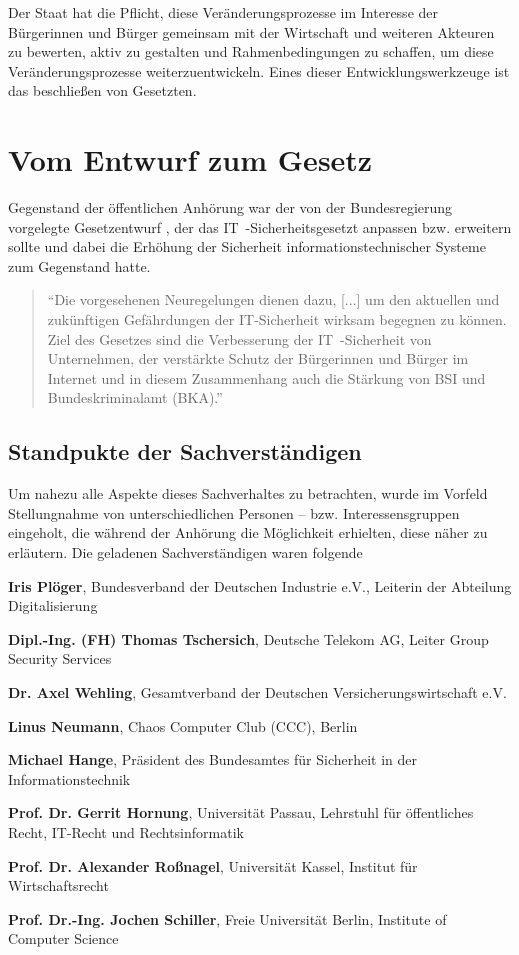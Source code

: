 \documentclass[a4paper,letterpaper,twocolumn,9,5pt,ngerman]{article}
\newcommand{\descitem}[1]{\textbf{#1}}	%
\begin{document}
Der Staat hat die Pflicht, diese Veränderungsprozesse im Interesse der Bürgerinnen und Bürger gemeinsam mit der Wirtschaft und weiteren Akteuren zu bewerten, aktiv zu gestalten und Rahmenbedingungen zu schaffen, um diese Veränderungsprozesse weiterzuentwickeln. \cite{BMI} Eines dieser Entwicklungswerkzeuge ist das beschließen von Gesetzten.

\section{Vom Entwurf zum Gesetz}
\label{sec:EntwurfzumGesetz}
Gegenstand der öffentlichen Anhörung  war der von der Bundesregierung vorgelegte Gesetzentwurf \cite{GesEntw15}, der das IT~-Sicherheitsgesetzt anpassen bzw. erweitern sollte und dabei die Erhöhung der Sicherheit informationstechnischer Systeme zum Gegenstand hatte. 
\begin{quotation}
"`Die vorgesehenen Neuregelungen dienen dazu, [...] um den aktuellen und zukünftigen Gefährdungen der IT-Sicherheit wirksam begegnen zu können. Ziel des Gesetzes sind die Verbesserung der IT~-Sicherheit von Unternehmen, der verstärkte Schutz der Bürgerinnen und Bürger im Internet und in diesem Zusammenhang auch die Stärkung von BSI und Bundeskriminalamt (BKA)."' 
\cite[S. 1]{GesEntw15} 
\end{quotation}

\subsection{Standpukte der Sachverständigen}
\label{subsec:StandpunkteSachverständige}
Um nahezu alle Aspekte dieses Sachverhaltes zu betrachten, wurde im Vorfeld Stellungnahme von unterschiedlichen Personen -- bzw. Interessensgruppen eingeholt, die während der Anhörung die Möglichkeit erhielten, diese näher zu erläutern. Die geladenen Sachverständigen waren folgende

\begin{description*}
    \item	{\descitem{Iris Plöger}}, Bundesverband der Deutschen Industrie e.V., Leiterin der Abteilung Digitalisierung
    \item	{\descitem{Dipl.-Ing.  (FH) Thomas Tschersich}}, Deutsche Telekom AG, Leiter Group Security Services
    \item	{\descitem{Dr. Axel Wehling}}, Gesamtverband der Deutschen Versicherungswirtschaft e.V.
    \item	{\descitem{Linus Neumann}}, Chaos Computer Club (CCC), Berlin

	\item	{\descitem{Michael Hange}}, Präsident des Bundesamtes für Sicherheit in der Informationstechnik
    \item	{\descitem{Prof. Dr. Gerrit Hornung}}, Universität Passau, Lehrstuhl für öffentliches Recht, IT-Recht und Rechtsinformatik
    \item	{\descitem{Prof. Dr. Alexander Roßnagel}}, Universität Kassel, Institut für Wirtschaftsrecht
    \item	{\descitem{Prof. Dr.-Ing. Jochen Schiller}}, Freie Universität Berlin, Institute of Computer Science
\end{description*}
\end{document}
